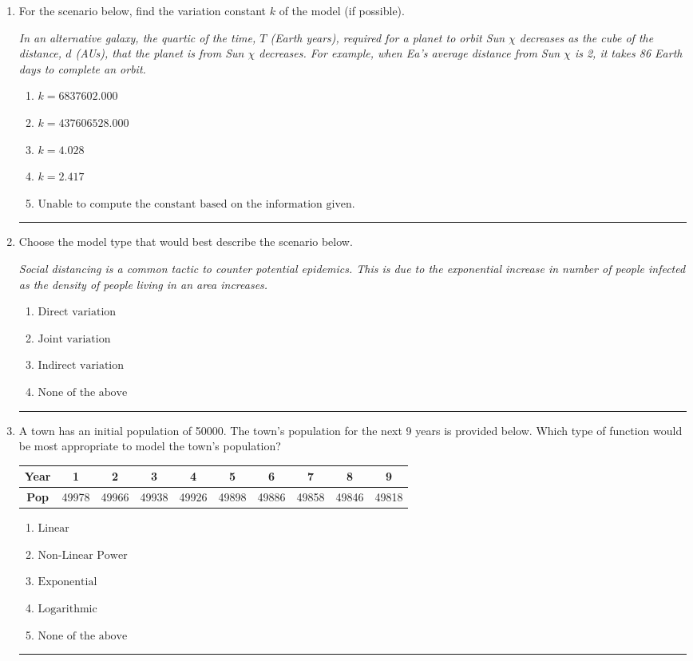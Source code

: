 \documentclass[14pt]{extbook}
\newcommand{\litem}[1]{\item#1\hspace*{-1cm}\rule{\textwidth}{0.4pt}}
\begin{document}
\begin{enumerate}
{\begin{enumerate}[label=\Alph*.]
\end{enumerate} }
\litem{
For the scenario below, find the variation constant $k$ of the model (if possible).
\begin{center}
    \textit{ In an alternative galaxy, the quartic of the time, $T$ (Earth years), required for a planet to orbit Sun $\chi$ decreases as the cube of the distance, $d$ (AUs), that the planet is from Sun $\chi$ decreases. For example, when Ea's average distance from Sun $\chi$ is 2, it takes 86 Earth days to complete an orbit. }
\end{center}
\begin{enumerate}[label=\Alph*.]
\item \( k = 6837602.000 \)
\item \( k = 437606528.000 \)
\item \( k = 4.028 \)
\item \( k = 2.417 \)
\item \( \text{Unable to compute the constant based on the information given.} \)

\end{enumerate} }
\litem{
Choose the model type that would best describe the scenario below.
\begin{center}
    \textit{ Social distancing is a common tactic to counter potential epidemics. This is due to the exponential increase in number of people infected as the density of people living in an area increases. }
\end{center}
\begin{enumerate}[label=\Alph*.]
\item \( \text{Direct variation} \)
\item \( \text{Joint variation} \)
\item \( \text{Indirect variation} \)
\item \( \text{None of the above} \)

\end{enumerate} }
\litem{
A town has an initial population of 50000. The town's population for the next 9 years is provided below. Which type of function would be most appropriate to model the town's population?

\begin{tabular}{c|c|c|c|c|c|c|c|c|c}
\textbf{Year} &1 &2 &3 &4 &5 &6 &7 &8 &9\tabularnewline \hline
\textbf{Pop} &49978 &49966 &49938 &49926 &49898 &49886 &49858 &49846 &49818\end{tabular}\begin{enumerate}[label=\Alph*.]
\item \( \text{Linear} \)
\item \( \text{Non-Linear Power} \)
\item \( \text{Exponential} \)
\item \( \text{Logarithmic} \)
\item \( \text{None of the above} \)


\end{enumerate}}
\end{enumerate}
\end{document}
